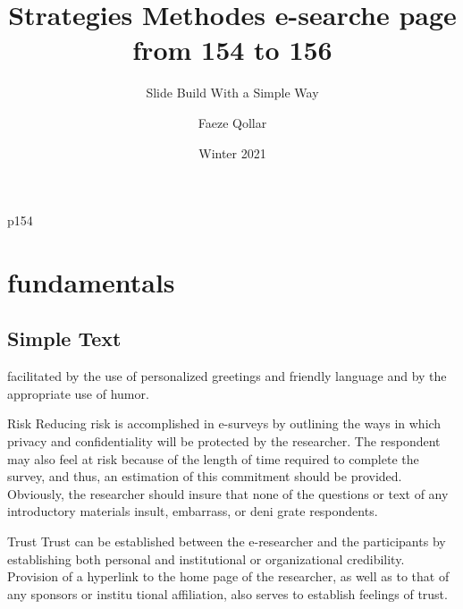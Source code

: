 \documentclass{beamer}
\title{Strategies Methodes e-searche page from 154 to 156}
\subtitle{Slide Build With a Simple Way‌}
\author{Faeze Qollar}
\institute{Payam Nour University}
\date{Winter 2021}
\begin{document}
\begin{frame}
\maketitle
\end{frame}

\everypar{\rightskip\rightmargin}
\begin{frame}{p154}
\section{fundamentals}
\subsection{Simple Text}
facilitated by the use of personalized greetings and friendly language and by the appropriate use of humor. 

Risk 
Reducing risk is accomplished in e-surveys by outlining the ways in which privacy and confidentiality will be protected 
by the researcher. The respondent may also feel at risk because of the length of time required to complete the survey, 
and thus, an estimation of this commitment should be provided. Obviously, the researcher should insure that none of the questions 
or text of any introductory materials insult, embarrass, or deni grate respondents.

Trust 
Trust can be established between the e-researcher and the participants by establishing both personal and institutional 
or organizational credibility. Provision of a hyperlink to the home page of the researcher, as well as to that of any sponsors 
or institu tional affiliation, also serves to establish feelings of trust.
\end{frame}


\end{document}
